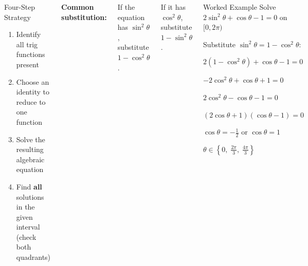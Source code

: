 \documentclass[aspectratio=169, 11pt]{beamer}
\begin{document}
\begin{frame}[t, plain]

  \begin{columns}[T]
    \begin{block}{Four-Step Strategy}
      \begin{enumerate}
        \item Identify all trig functions present
        \item Choose an identity to reduce to one function
        \item Solve the resulting algebraic equation
        \item Find \textbf{all} solutions in the given interval (check both quadrants)
      \end{enumerate}
    \end{block}

    \vspace{4pt}
    \textbf{Common substitution:}

    If the equation has $\sin^2\theta$, substitute $1 - \cos^2\theta$.

    If it has $\cos^2\theta$, substitute $1 - \sin^2\theta$.

    \begin{block}{Worked Example}
      Solve $2\sin^2\theta + \cos\theta - 1 = 0$ on $[0, 2\pi)$

      \vspace{4pt}
      Substitute $\sin^2\theta = 1 - \cos^2\theta$:

      $2(1 - \cos^2\theta) + \cos\theta - 1 = 0$

      $-2\cos^2\theta + \cos\theta + 1 = 0$

      $2\cos^2\theta - \cos\theta - 1 = 0$

      $(2\cos\theta + 1)(\cos\theta - 1) = 0$

      $\cos\theta = -\tfrac{1}{2}$ \; or \; $\cos\theta = 1$

      \vspace{2pt}
      $\theta \in \left\{0,\; \tfrac{2\pi}{3},\; \tfrac{4\pi}{3}\right\}$
    \end{block}
  \end{columns}
\end{frame}
\end{document}
